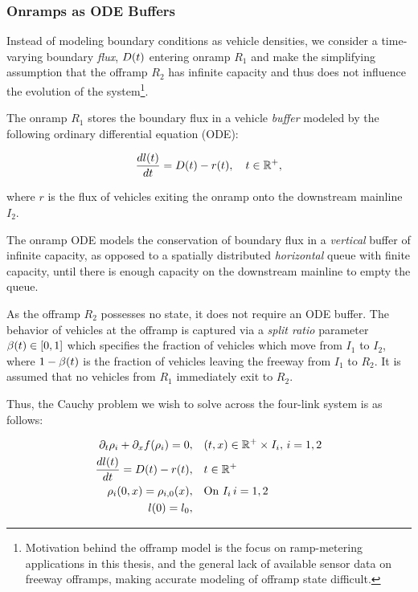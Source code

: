 \subsubsection{Onramps as ODE Buffers}

Instead of modeling boundary conditions as vehicle densities, we consider a time-varying boundary \emph{flux}, $\demandsym\left(t\right)$ entering onramp $R_1$ and make the simplifying assumption that the offramp $R_2$ has infinite capacity and thus does not influence the evolution of the system\footnote{Motivation behind the offramp model is the focus on ramp-metering applications in this thesis, and the general lack of available sensor data on freeway offramps, making accurate modeling of offramp state difficult.}.

The onramp $R_1$ stores the boundary flux in a vehicle \emph{buffer} modeled by the following ordinary differential equation (ODE):

\begin{equation}
\label{eqn:ode-buffer}
\Dfrac{l\left(t\right)}{t} = \demandsym\left(t\right) - r\left(t\right),\quad t\in \R^+,
\end{equation}

where $r$ is the flux of vehicles exiting the onramp onto the downstream mainline $I_2$.

The onramp ODE models the conservation of boundary flux in a \emph{vertical} buffer of infinite capacity, as opposed to a spatially distributed \emph{horizontal} queue with finite capacity, until there is enough capacity on the downstream mainline to empty the queue.

As the offramp $R_2$ possesses no state, it does not require an ODE buffer. The behavior of vehicles at the offramp is captured via a \emph{split ratio} parameter $\splitratio \left(t\right) \in \left[0,1\right]$ which specifies the fraction of vehicles which move from $I_1$ to $I_2$, where $1 - \splitratio\left(t\right)$ is the fraction of vehicles leaving the freeway from $I_1$ to $R_2$. It is assumed that no vehicles from $R_1$ immediately exit to $R_2$.

Thus, the Cauchy problem we wish to solve across the four-link system is as follows:

\begin{align}
\partial_t \rho_i + \partial_x f\left(\rho_i\right) = 0, & \quad \left(t,x\right) \in \R^+ \times I_i, \, i = 1,2 \\
\Dfrac{l\left(t\right)}{t} = \demandsym\left(t\right) - r\left(t\right), & \quad t\in \R^+ \\
\rho_i \left(0,x\right) = \rho_{i,0} \left(x\right), & \quad \text{On } I_i\, i = 1,2 \\
l\left(0\right) = l_0, &
\end{align}

